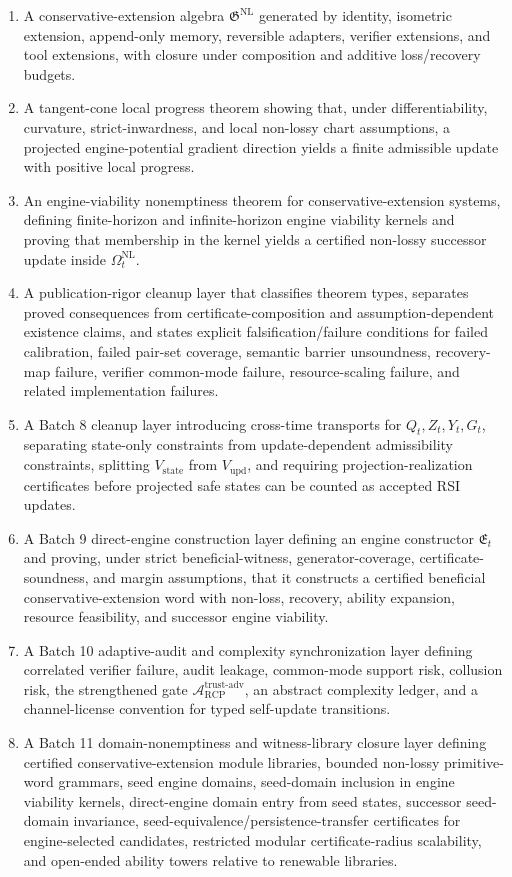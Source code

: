 \documentclass[11pt]{article}
\newcommand{\Acal}{\mathcal{A}}
\newcommand{\1}{\mathbf{1}}
\newcommand{\RCP}{\mathrm{RCP}}
\newcommand{\state}{\mathrm{state}}
\providecommand{\upd}{\mathrm{upd}}
\begin{document}
\begin{enumerate}[label=(\roman*)]
    \item A conservative-extension algebra \(\mathfrak G^{\mathrm{NL}}\) generated by identity, isometric extension, append-only memory, reversible adapters, verifier extensions, and tool extensions, with closure under composition and additive loss/recovery budgets.
    \item A tangent-cone local progress theorem showing that, under differentiability, curvature, strict-inwardness, and local non-lossy chart assumptions, a projected engine-potential gradient direction yields a finite admissible update with positive local progress.
    \item An engine-viability nonemptiness theorem for conservative-extension systems, defining finite-horizon and infinite-horizon engine viability kernels and proving that membership in the kernel yields a certified non-lossy successor update inside \(\Omega_t^{\mathrm{NL}}\).
    \item A publication-rigor cleanup layer that classifies theorem types, separates proved consequences from certificate-composition and assumption-dependent existence claims, and states explicit falsification/failure conditions for failed calibration, failed pair-set coverage, semantic barrier unsoundness, recovery-map failure, verifier common-mode failure, resource-scaling failure, and related implementation failures.
    \item A Batch 8 cleanup layer introducing cross-time transports for \(Q_t,Z_t,Y_t,G_t\), separating state-only constraints from update-dependent admissibility constraints, splitting \(V_{\state}\) from \(V_{\upd}\), and requiring projection-realization certificates before projected safe states can be counted as accepted RSI updates.
    \item A Batch 9 direct-engine construction layer defining an engine constructor \(\mathfrak E_t\) and proving, under strict beneficial-witness, generator-coverage, certificate-soundness, and margin assumptions, that it constructs a certified beneficial conservative-extension word with non-loss, recovery, ability expansion, resource feasibility, and successor engine viability.
    \item A Batch 10 adaptive-audit and complexity synchronization layer defining correlated verifier failure, audit leakage, common-mode support risk, collusion risk, the strengthened gate \(\Acal_{\RCP}^{\mathrm{trust\mbox{-}adv}}\), an abstract complexity ledger, and a channel-license convention for typed self-update transitions.
    \item A Batch 11 domain-nonemptiness and witness-library closure layer defining certified conservative-extension module libraries, bounded non-lossy primitive-word grammars, seed engine domains, seed-domain inclusion in engine viability kernels, direct-engine domain entry from seed states, successor seed-domain invariance, seed-equivalence/persistence-transfer certificates for engine-selected candidates, restricted modular certificate-radius scalability, and open-ended ability towers relative to renewable libraries.

\end{enumerate}
\end{document}
